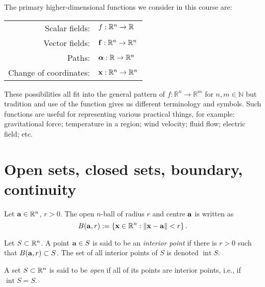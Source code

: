 \begin{samepage}
    The primary higher-dimensional functions we consider in this course are:
    \begin{center}
        \begin{tabular}{r l}
            Scalar fields:
             &
            \(f:\bR^n \to \bR\)                   \\
            Vector fields:
             &
            \(\mathbf{f}:\bR^n \to \bR^n\)        \\
            Paths:
             &
            \(\boldsymbol{\alpha}:\bR \to \bR^n\) \\
            Change of coordinates:
             &
            \(\xx:\bR^n \to \bR^n\)
        \end{tabular}
    \end{center}
\end{samepage}
\noindent
These possibilities all fit into the general pattern of \(f:\mathbb{R}^n \to \mathbb{R}^m\) for $n,m\in \mathbb{N}$ but tradition and use of the function gives us different terminology and symbols.
Such functions are useful for representing various practical things, for example:
gravitational force; temperature in a region; wind velocity; fluid flow; electric field; etc.



\section{Open sets, closed sets, boundary, continuity}

Let \(\aa \in \bR^n\), \(r>0\).
The open \(n\)-ball of radius \(r\) and centre \(\aa\) is written as
\[
    B(\aa,r):= \left\{ \xx \in \bR^n : \norm{\xx - \aa}< r  \right\}.
\]

\begin{definition}
    Let \(S \subset \bR^n\).
    A point \(\aa \in S\) is said to be an \emph{interior point} if there is \(r>0\) such that \( B(\aa,r) \subset S\).
    The set of all interior points of \(S\) is denoted \(\operatorname{int} S\).
\end{definition}

\begin{definition}
    A set \(S \subset \bR^n\) is said to be \emph{open} if all of its points are interior points, i.e., if \(\operatorname{int} S = S\).
\end{definition}



